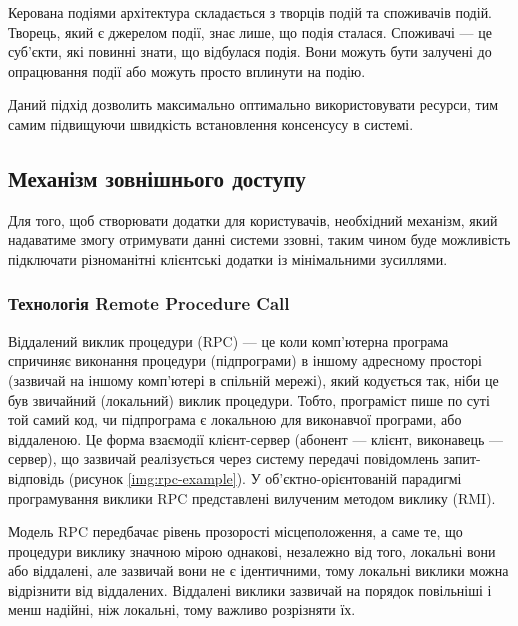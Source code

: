 \documentclass{lib/styles/default-style}
\begin{document}

    Керована подіями архітектура складається з творців подій та споживачів подій.
    Творець, який є джерелом події, знає лише, що подія сталася.
    Споживачі --- це суб'єкти, які повинні знати, що відбулася подія.
    Вони можуть бути залучені до опрацювання події або можуть просто вплинути на подію.

    Даний підхід дозволить максимально оптимально використовувати ресурси, тим самим підвищуючи швидкість встановлення консенсусу в системі.

\subsection{Механізм зовнішнього доступу}

    Для того, щоб створювати додатки для користувачів, необхідний механізм, який надаватиме змогу отримувати данні системи ззовні,
    таким чином буде можливість підключати різноманітні клієнтські додатки із мінімальними зусиллями.

    \subsubsection{Технологія Remote Procedure Call}

    Віддалений виклик процедури (RPC) --- це коли комп'ютерна програма спричиняє виконання процедури (підпрограми) в
    іншому адресному просторі (зазвичай на іншому комп’ютері в спільній мережі),
    який кодується так, ніби це був звичайний (локальний) виклик процедури.
    Тобто, програміст пише по суті той самий код, чи підпрограма є локальною для виконавчої програми, або віддаленою.
    Це форма взаємодії клієнт-сервер (абонент --- клієнт, виконавець --- сервер), що зазвичай реалізується через систему передачі
    повідомлень запит-відповідь (рисунок \ref{img:rpc-example}). У об'єктно-орієнтованій парадигмі програмування виклики RPC
    представлені вилученим методом виклику (RMI).


    Модель RPC передбачає рівень прозорості місцеположення, а саме те,
    що процедури виклику значною мірою однакові, незалежно від того,
    локальні вони або віддалені, але зазвичай вони не є ідентичними,
    тому локальні виклики можна відрізнити від віддалених.
    Віддалені виклики зазвичай на порядок повільніші і менш надійні, ніж локальні, тому важливо розрізняти їх.
\end{document}
